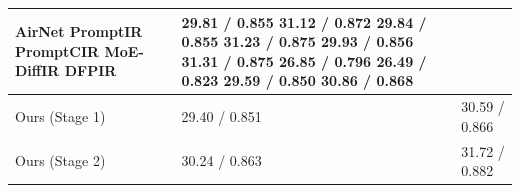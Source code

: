 \begin{tabular}{lll}
\toprule
AirNet PromptIR PromptCIR MoE-DiffIR DFPIR & 29.81 / 0.855 31.12 / 0.872 29.84 / 0.855 31.23 / 0.875 29.93 / 0.856 31.31 / 0.875 26.85 / 0.796 26.49 / 0.823 29.59 / 0.850 30.86 / 0.868 &  \\
\midrule
Ours (Stage 1) & 29.40 / 0.851 & 30.59 / 0.866 \\
Ours (Stage 2) & 30.24 / 0.863 & 31.72 / 0.882 \\
\bottomrule
\end{tabular}
